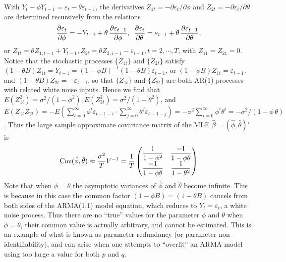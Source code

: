\begin{ex}
 With $Y_t - \phi Y_{t-1} = \varepsilon_t - \theta\varepsilon_{t-1}$, the derivatives $Z_{1t} = -\partial\varepsilon_t/\partial\phi$ and $Z_{2t} = -\partial\varepsilon_t/\partial\theta$ are determined recursively from the relations
	\[
	\frac{\partial\varepsilon_t}{\partial\phi} = -Y_{t-1} + \theta\, \frac{\partial\varepsilon_{t-1}}{\partial\phi}, \enskip \frac{\partial\varepsilon_t}{\partial\theta} = \varepsilon_{t-1} + \theta \, \frac{\partial\varepsilon_{t-1}}{\partial\theta},
	\]
or $Z_{1t} = \theta Z_{1,t-1} + Y_{t-1}, Z_{2t} = \theta Z_{2,i-1} - \varepsilon_{i-1}, t= 2,\cdots,T$, with $Z_{11} = Z_{21} = 0$. Notice that the stochastic processes $\{Z_{1t}\}$ and $\{Z_{2t}\}$ satisfy $(1 - \theta B)Z_{1t} = Y_{t-1} = (1 - \phi B)^{-1}(1 - \theta B)\varepsilon_{t-1}$, or $(1 - \phi B)Z_{1t} = \varepsilon_{t-1}$, and $(1 - \theta B)Z_{2t} = -\varepsilon_{t-1}$, so that $\{Z_{1t}\}$ and $\{Z_{2t}\}$ are both AR(1) processes with related white noise inputs. Hence we find that $E(Z_{1t}^2) = \sigma^2/(1 - \phi^2), E(Z_{2t}^2) = \sigma^2/(1 - \theta^2)$, and $E(Z_{1t}Z_{2t}) = -E\left(\sum_{t=0}^\infty\phi^i\varepsilon_{t-1-i} \cdot \sum_{j=0}^\infty\theta^j\varepsilon_{t-1-j}\right) = -\sigma^2\sum_{i=0}^\infty\phi^i\theta^i = -\sigma^2/(1 - \phi\,\theta)$. Thus the large sample approximate covariance matrix of the MLE $\hat{\beta} = (\hat{\phi},\hat{\theta})'$ is
	\[
	\operatorname{Cov}(\hat{\phi}, \hat{\theta}) \approx \frac{\sigma^2}{T} V^{-1} = \frac{1}{T} 
	\begin{pmatrix}
	\dfrac{1}{1-\phi^2} & \dfrac{-1}{1-\phi \theta} \\
	\dfrac{-1}{1-\phi \theta} & \dfrac{1}{1-\theta^2}
	\end{pmatrix}
	\]
Note that when $\phi = \theta$ the asymptotic variances of $\hat{\phi}$ and $\hat{\theta}$ become infinite. This is because in this case the common factor $(1- \phi B) = (1 - \theta B)$ cancels from both sides of the ARMA(1,1) model equation, which reduces to $Y_t = \varepsilon_t$, a white noise process. Thus there are no ``true'' values for the parameter $\phi$ and $\theta$ when $\phi = \theta$, their common value is actually arbitrary, and cannot be estimated. This is an example of what is known as parameter redundancy (or parameter non-identifiability), and can arise when one attempts to ``overfit'' an ARMA model using too large a value for both $p$ and $q$. \\
\end{ex}


